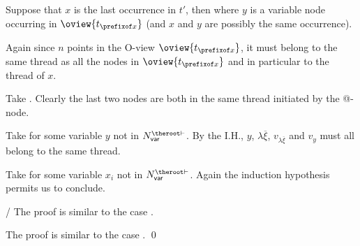 \begin{compactitem}
\begin{compactitem}
        \item Suppose that $x$ is the last occurrence in $t'$, then
         where $y$ is a variable node occurring in $\oview{t_{\prefixof x}}$ (and $x$ and $y$ are possibly the same occurrence).

            Again since $n$ points in the O-view $\oview{t_{\prefixof x}}$, it must belong to the same thread
            as all the nodes in $\oview{t_{\prefixof x}}$ and in particular to the thread of $x$.
        \end{compactitem}

    \item[\rulenamet{Value$^{\lambda\mapsto@}$}]
      Take . Clearly the last two nodes are
    both in the same thread initiated by the @-node.

     \item[\rulenamet{Value$^{\lambda\mapsto{\sf var}}$}] Take  for some variable $y$ not in $N_{\sf var}^{\theroot\vdash}$. By the I.H., $y$, $\lambda \overline{\xi}$, $v_{\lambda \overline{\xi}}$ and $v_y$ must all belong to the same thread.

    \item[\rulenamet{Var}]
    Take  for some
        variable $x_i$ not in $N_{\sf var}^{\theroot\vdash}$.
        Again the induction hypothesis permits us to conclude.

    \item[\rulenamet{$\Sigma$}/\rulenamet{$\Sigma$-var}]
    The proof is similar to the case .
    \item[\rulenamet{$\Sigma$-Value}]
    The proof is similar to the case
    .
    \qed
\end{compactitem}

